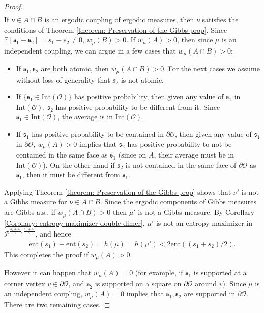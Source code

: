 \documentclass[11pt]{article}
\theoremstyle{remark}
\theoremstyle{definition}
\newcommand{\ent}{\text{ent}}
\newcommand{\mc}[1]{\mathcal{#1}}
\newcommand{\m}[1]{\mathbb{#1}}
\begin{document}
\begin{proof}
\begin{align*}
\end{align*}
If $\nu\in A\cap B$ is an ergodic coupling of ergodic measures, then $\nu$ satisfies the conditions of Theorem \ref{theorem: Preservation of the Gibbs prop}. Since $\m E[\mathfrak s_1 - \mathfrak s_2] = s_1 - s_2 \neq 0$, $w_\mu(B)>0$. If $w_\mu(A)>0$, then since $\mu$ is an independent coupling, we can argue in a few cases that $w_\mu(A\cap B)>0$: 
  \begin{itemize}
        \item If $\mathfrak s_1, \mathfrak s_2$ are both atomic, then $w_\mu(A\cap B)>0$. For the next cases we assume without loss of generality that $\mathfrak s_2$ is not atomic. 
        \item If $\{\mathfrak s_1\in \text{Int}(\mc O)\}$ has positive probability, then given any value of $\mathfrak{s}_1$ in $\text{Int}(\mc O)$, $\mathfrak{s}_2$ has positive probability to be different from it. Since $\mathfrak s_1 \in \text{Int}(\mc O)$, the average is in $\text{Int}(\mc O)$.
        \item If $\mathfrak s_1$ has positive probability to be contained in $\partial \mc O$, then given any value of $\mathfrak{s}_1$ in $\partial \mc O$, $w_\mu(A)>0$ implies that $\mathfrak{s}_2$ has positive probability to not be contained in the same face as $\mathfrak s_1$ (since on $A$, their average must be in $\text{Int}(\mc O)$). On the other hand if $\mathfrak{s}_2$ is not contained in the same face of $\partial \mc O$ as $\mathfrak s_1$, then it must be different from $\mathfrak s_1$.
    \end{itemize}
Applying Theorem \ref{theorem: Preservation of the Gibbs prop} shows that $\nu'$ is not a Gibbs measure for $\nu\in A\cap B$. Since the ergodic components of Gibbs measures are Gibbs a.s., if $w_\mu(A\cap B)> 0$ then $\mu'$ is not a Gibbs measure. By Corollary \ref{Corollary: entropy maximizer double dimer}, $\mu'$ is not an entropy maximizer in $\mathcal P^{\frac{s_1+s_2}{2}, \frac{s_1+s_2}{2}}$, and hence
\begin{align*}
 \ent(s_1) + \ent(s_2) = h(\mu)= h(\mu') < 2 \ent((s_1+s_2)/2).
\end{align*}
This completes the proof if $w_\mu(A) >0$. 


However it can happen that $w_\mu(A) = 0$ (for example, if $\mathfrak s_1$ is supported at a corner vertex $v\in \partial \mc O$, and $\mathfrak s_2$ is supported on a square on $\partial \mc O$ around $v$). Since $\mu$ is an independent coupling, $w_\mu(A)=0$ implies that $\mathfrak s_1, \mathfrak s_2$ are supported in $\partial \mc O$. There are two remaining cases. 


\end{proof}
\end{document}
